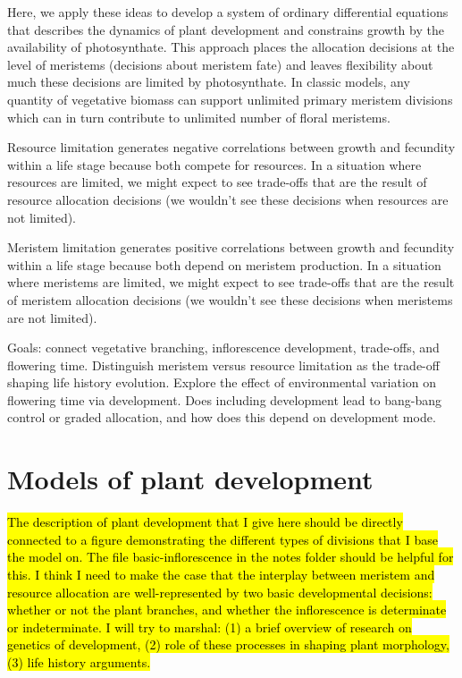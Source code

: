 \documentclass[12pt, oneside,titlepage]{article}   	%
\begin{document}
Here, we apply these ideas to develop a system of ordinary differential equations that describes the dynamics of plant development and constrains growth by the availability of photosynthate. This approach places the allocation decisions at the level of meristems (decisions about meristem fate) and leaves flexibility about much these decisions are limited by photosynthate. In classic models, any quantity of vegetative biomass can support unlimited primary meristem divisions which can in turn  contribute to unlimited number of floral meristems.

Resource limitation generates negative correlations between growth and fecundity within a life stage because both compete for resources. In a situation where resources are limited, we might expect to see trade-offs that are the result of resource allocation decisions (we wouldn't see these decisions when resources are not limited).

Meristem limitation generates positive correlations between growth and fecundity within a life stage because both depend on meristem production. In a situation where meristems are limited, we might expect to see trade-offs that are the result of meristem allocation decisions (we wouldn't see these decisions when meristems are not limited). 

Goals: connect vegetative branching, inflorescence development, trade-offs, and flowering time. Distinguish meristem versus resource limitation as the trade-off shaping life history evolution. Explore the effect of environmental variation on flowering time via development. Does including development lead to bang-bang control or graded allocation, and how does this depend on development mode.

\section{Models of plant development}

\hl{ The description of plant development that I give here should be directly connected to a figure demonstrating the different types of divisions that I base the model on. The file basic-inflorescence in the notes folder should be helpful for this. I think I need to make the case that the interplay between meristem and resource allocation are well-represented by two basic developmental decisions: whether or not the plant branches, and whether the inflorescence is determinate or indeterminate. I will try to marshal: (1) a brief overview of research on genetics of development, (2) role of these processes in shaping plant morphology, (3) life history arguments. }
\end{document}
